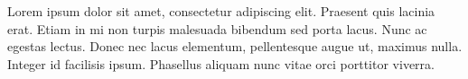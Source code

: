 \begin{dedication}
    Lorem ipsum dolor sit amet, consectetur adipiscing elit. Praesent quis lacinia erat. Etiam in mi non turpis malesuada bibendum sed porta lacus. Nunc ac egestas lectus. Donec nec lacus elementum, pellentesque augue ut, maximus nulla. Integer id facilisis ipsum. Phasellus aliquam nunc vitae orci porttitor viverra. 
\end{dedication}